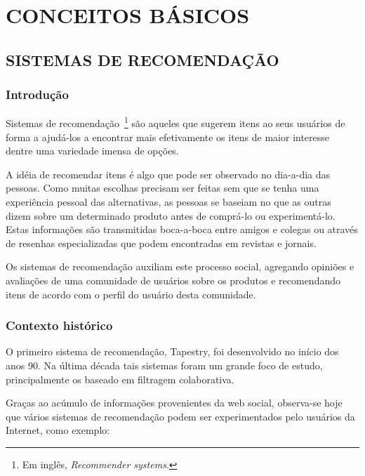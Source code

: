 \chapter{CONCEITOS BÁSICOS} %
\label{cha:conceitos_basicos}

\section{SISTEMAS DE RECOMENDAÇÃO}

\subsection{Introdução}
Sistemas de recomendação~\footnote{Em inglês, \textit{Recommender systems}.} são aqueles que sugerem itens ao seus usuários de forma a ajudá-los a encontrar mais efetivamente os itens de maior interesse dentre uma variedade imensa de opções.

A idéia de recomendar itens é algo que pode ser observado no dia-a-dia das pessoas. Como muitas escolhas precisam ser feitas sem que se tenha uma experiência pessoal das alternativas, as pessoas se baseiam no que as outras dizem sobre um determinado produto antes de comprá-lo ou experimentá-lo. Estas informações são transmitidas boca-a-boca entre amigos e colegas ou através de resenhas especializadas que podem encontradas em revistas e jornais.

Os sistemas de recomendação auxiliam este processo social, agregando opiniões e avaliações de uma comunidade de usuários sobre os produtos e recomendando itens de acordo com o perfil do usuário desta comunidade.

\subsection{Contexto histórico}
O primeiro sistema de recomendação, Tapestry\cite{Goldberg92}, foi desenvolvido no início dos anos 90. Na última década tais sistemas foram um grande foco de estudo, principalmente os baseado em filtragem colaborativa.~\cite{Resnick97}~\cite{Herlocker04}

Graças ao acúmulo de informações provenientes da web social, observa-se hoje que vários sistemas de recomendação podem ser experimentados pelo usuários da Internet, como exemplo:

